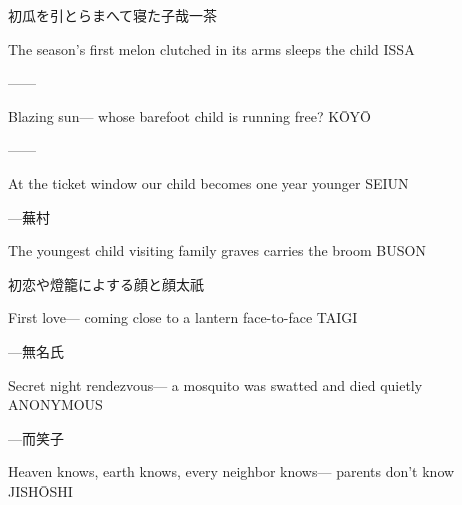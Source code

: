 \begin{haiku}
    {\FH 初瓜を引とらまへて寝た子哉}\hfill{\FH 一茶}

    \vin{} The season's first melon
    \vin{} \vin{} clutched in its arms
    \vin{} \vin{} \vin{} sleeps the child \hspace{\fill} ISSA
\end{haiku}

\begin{haiku}
   ---\hfill{---}

    \vin{} Blazing sun---
    \vin{} \vin{} whose barefoot child
    \vin{} \vin{} \vin{} is running free? \hspace{\fill} K\={O}Y\={O}
\end{haiku}

\begin{haiku}
   ---\hfill{---}

    \vin{} At the ticket window
    \vin{} \vin{} our child becomes
    \vin{} \vin{} \vin{} one year younger \hspace{\fill} SEIUN
\end{haiku}

\begin{haiku}
    {---}\hfill{\FH 蕪村}

    \vin{} The youngest child
    \vin{} \vin{} visiting family graves
    \vin{} \vin{} \vin{} carries the broom \hspace{\fill} BUSON
\end{haiku}

\begin{haiku}
    {\FH 初恋や燈籠によする顔と顔}\hfill{\FH 太祇}

    \vin{} First love---
    \vin{} \vin{} coming close to a lantern
    \vin{} \vin{} \vin{} face-to-face \hspace{\fill} TAIGI
\end{haiku}

\begin{haiku}
    {---}\hfill{\FH 無名氏}

    \vin{} Secret night rendezvous---
    \vin{} \vin{} a mosquito was swatted
    \vin{} \vin{} \vin{} and died quietly \hspace{\fill} ANONYMOUS
\end{haiku}

\begin{haiku}
    {---}\hfill{\FH 而笑子}

    \vin{} Heaven knows,
    \vin{} \vin{} earth knows, every neighbor knows---
    \vin{} \vin{} \vin{} parents don't know \hspace{\fill} JISH\={O}SHI
\end{haiku}


